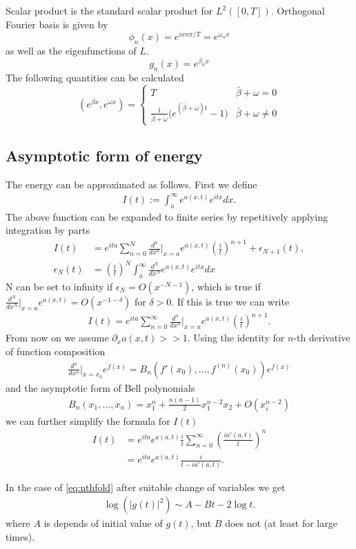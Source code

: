 \documentclass[
a4paper,%
10pt,%
titlepage,%
twoside%
]{article}
\begin{document}
Scalar product is the standard scalar product for
$L^2([0,T])$. Orthogonal Fourier basis is given by
\begin{equation}
  \label{eq:fourier_base}
  \phi_n(x)=e^{i x n \pi/T}=e^{\omega_n x}
\end{equation}
as well as the eigenfunctions of $L$.
\begin{equation}
  g_n(x)=e^{ \beta_n x}
\end{equation}
The following quantities can be calculated
\begin{equation}
  (e^{\beta x},e^{\omega x})=
  \begin{cases}
    T & \bar\beta+\omega=0 \\
    \frac{1}{\bar{\beta}+\omega}\big(e^{(\bar\beta+\omega)t}-1\big)         & \bar\beta+\omega\ne0
  \end{cases}
\end{equation}

\subsection{Asymptotic form of energy}


The energy can be approximated as follows. First we define
\begin{align}
  I(t):=\int_a^\infty e^{a(x,t)}e^{itx}dx.
\end{align}
The above function can be expanded to finite series by repetitively
applying integration by parts
\begin{align}
  I(t)&=e^{ita}\sum_{n=0}^N\frac{d^n}{dx^n}\bigg|_{x=a}e^{a(x,t)} \left(\frac{i}{t}\right)^{n+1}+\epsilon_{N+1}(t),\\
  \epsilon_{N}(t)&=\left(\frac{i}{t}\right)^{N}\int_a^\infty \frac{d^{N}}{dx^{N}}e^{a(x,t)}e^{itx}dx
\end{align}
N can be set to infinity if $\epsilon_N=O(x^{-N-1})$, which is true if
$\frac{d^{N}}{dx^{N}}\bigg|_{x=a}e^{a(x,t)}=O(x^{-1-\delta})$ for
$\delta>0$. If this is true we can write
\begin{align}
  I(t)=e^{ita}\sum_{n=0}^\infty\frac{d^n}{dx^n}\bigg|_{x=a}e^{a(x,t)} \left(\frac{i}{t}\right)^{n+1}.
\end{align}
From now on we assume $\partial_x a(x,t)>>1$. Using the identity for
$n$-th derivative of function composition
\begin{align}
  \frac{d^n}{dx^n}\bigg|_{x=x_0}e^{f(x)}=B_n(f'(x_0),...,f^{(n)}(x_0))e^{f(x)}
\end{align}
and the asymptotic form of Bell polynomials
\begin{align}
  B_n(x_1,...,x_n) = x_1^n + \frac{n(n-1)}{2}x_1^{n-2}x_2+O(x_i^{n-2})
\end{align}
we can further simplify the formula for $I(t)$
\begin{align}
  I(t)&=e^{ita}e^{a(a,t)}\frac{i}{t}\sum_{n=0}^\infty \left(\frac{ia'(a,t)}{t}\right)^{n}\\
  &=e^{ita}e^{a(a,t)}\frac{i}{t-ia'(a,t)}.
\end{align}

In the case of \eqref{eq:nthfold} after suitable change of variables we get
\begin{align}
  \log(|g(t)|^2)\sim A-Bt-2\log t.
\end{align}
where $A$ is depends of initial value of $g(t)$, but $B$ does not (at
least for large times).
\end{document}
